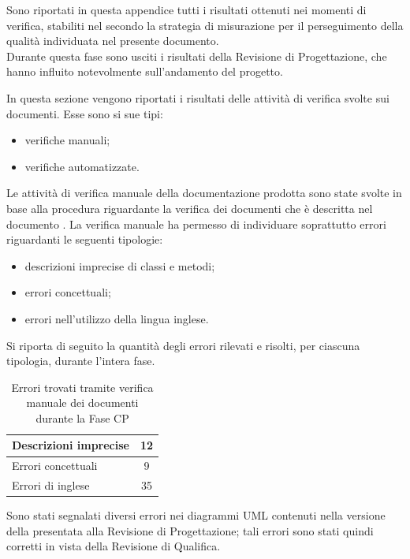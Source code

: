 
Sono riportati in questa appendice tutti i risultati ottenuti nei momenti di verifica, stabiliti nel  secondo la strategia di misurazione per il perseguimento della qualità individuata nel presente documento.\\
Durante questa fase sono usciti i risultati della Revisione di Progettazione, che hanno influito notevolmente sull'andamento del progetto.

In questa sezione vengono riportati i risultati delle attività di verifica svolte sui documenti. Esse sono si sue tipi:
\begin{itemize}
\item verifiche manuali;
\item verifiche automatizzate.
\end{itemize}
Le attività di verifica manuale della documentazione prodotta sono state svolte in base alla procedura riguardante la verifica dei documenti che è descritta nel documento .
La verifica manuale ha permesso di individuare soprattutto errori riguardanti le seguenti tipologie:
\begin{itemize}
\item descrizioni imprecise di classi e metodi;
\item errori concettuali;
\item errori nell'utilizzo della lingua inglese.
\end{itemize}
Si riporta di seguito la quantità degli errori rilevati e risolti, per ciascuna tipologia, durante l'intera fase.
\begin{table}[H]
	\centering
		\begin{tabu}{| l | c |}
			\hline
				Descrizioni imprecise	&	12\\ \hline
				Errori concettuali	&	9\\ \hline
				Errori di inglese  &  35\\ \hline
		\end{tabu}
		\caption{Errori trovati tramite verifica manuale dei documenti durante la Fase CP}
\end{table}

Sono stati segnalati diversi errori nei diagrammi UML contenuti nella versione della  presentata alla Revisione di Progettazione; tali errori sono stati quindi corretti in vista della Revisione di Qualifica.

